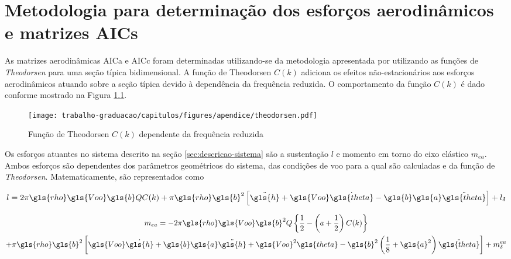 \chapter{Metodologia para determinação dos esforços aerodinâmicos e matrizes \textbf{AIC}s}   %

As matrizes aerodinâmicas \gls{AICa} e \gls{AICc} foram determinadas utilizando-se da metodologia apresentada por \textcite{book:Bisplinghoff} utilizando as funções de \textit{Theodorsen} para uma seção típica bidimensional. A função de Theodorsen $C(k)$ adiciona os efeitos não-estacionários aos esforços aerodinâmicos atuando sobre a seção típica devido à dependência da frequência reduzida. O comportamento da função $C(k)$ é dado conforme mostrado na Figura \ref{fig:Theodorsen}.

\begin{figure}[ht!]
    \centering
    \caption{Função de Theodorsen $C(k)$ dependente da frequência reduzida}
    \noindent\texttt{[image: trabalho-graduacao/capitulos/figures/apendice/theodorsen.pdf]}
    \label{fig:Theodorsen}
\end{figure}

Os esforços atuantes no sistema descrito na seção \ref{sec:descricao-sistema} são a sustentação $l$ e momento em torno do eixo elástico $m_{ea}$. Ambos esforços são dependentes dos parâmetros geométricos do sistema, das condições de voo para a qual são calculadas e da função de \textit{Theodorsen}. Matematicamente, são representados como

\begin{equation}\label{eq:sustentacao}
    l = 2\pi\gls{rho}\gls{Voo}\gls{b}QC(k) + \pi\gls{rho}\gls{b}^{2}\left[ \ddot{\gls{h}} + \gls{Voo}\dot{\gls{theta}} - \gls{b}\gls{a}\ddot{\gls{theta}} \right] + l_{\delta}
\end{equation}

\begin{multline}\label{eq:momento-ea}
    m_{ea} = -2\pi\gls{rho}\gls{Voo}\gls{b}^{2}Q\left\{ \frac{1}{2} - \left( a + \frac{1}{2} \right)C(k) \right\} \\ + \pi\gls{rho}\gls{b}^{2}\left[ \gls{Voo}\dot{\gls{h}} + \gls{b}\gls{a}\ddot{\gls{h}} + \gls{Voo}^{2}\gls{theta} - \gls{b}^{2}\left( \frac{1}{8}+\gls{a}^{2} \right) \ddot{\gls{theta}} \right] + m_{\delta}^{ea}
\end{multline}

